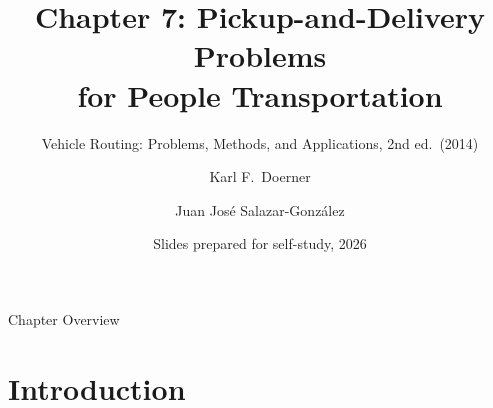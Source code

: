 \documentclass[aspectratio=169,10pt]{beamer}
\title[Ch.7 Pickup \& Delivery for People]{%
  Chapter 7: Pickup-and-Delivery Problems\\[2pt]
  for People Transportation}
\subtitle{Vehicle Routing: Problems, Methods, and Applications, 2nd ed.\ (2014)}
\author{Karl F.\ Doerner \and Juan Jos\'e Salazar-Gonz\'alez}
\date{Slides prepared for self-study, 2026}
\begin{document}

\begin{frame}
  \titlepage
\end{frame}

\begin{frame}[allowframebreaks]{Chapter Overview}
  \tableofcontents
\end{frame}

\section{Introduction}
\end{document}
